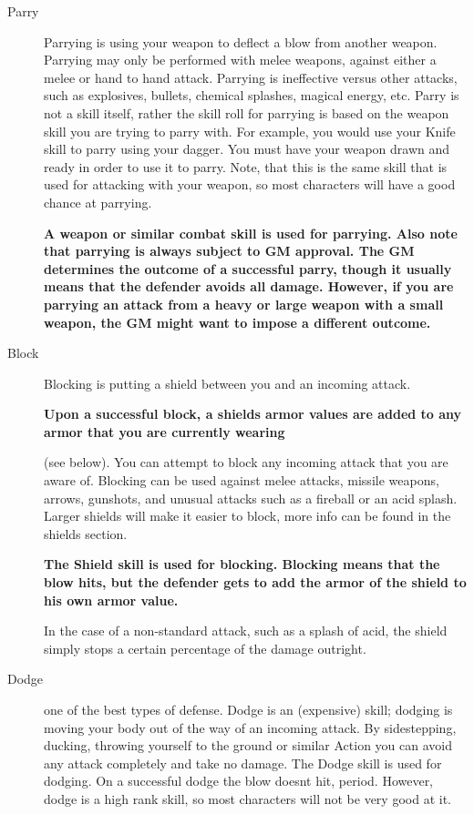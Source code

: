 \documentclass[twoside]{book}
\begin{document}
\begin{description}
    
  \item[Parry] 
    {  
    Parrying is using your weapon to deflect a blow from another weapon. Parrying may only be performed with melee weapons, against either a melee or hand to hand attack. Parrying is ineffective versus other attacks, such as explosives, bullets, chemical splashes, magical energy, etc. Parry is not a skill itself, rather the skill roll for parrying is based on the weapon skill you are trying to parry with. For example, you would use your Knife skill to parry using your dagger. You must have your weapon drawn and ready in order to use it to parry. Note, that this is the same skill that is used for attacking with your weapon, so most characters will have a good chance at parrying.

 \textbf{A weapon or similar combat skill is used for parrying. Also note that parrying is always subject to GM approval. The GM determines the outcome of a successful parry, though it usually means that the defender avoids all damage. However, if you are parrying an attack from a heavy or large weapon with a small weapon, the GM might want to impose a different outcome.}


    }
  
  \item[Block] 
    {  
    Blocking is putting a shield between you and an incoming attack.

 \textbf{Upon a successful block, a shields armor values are added to any armor that you are currently wearing}

(see below). You can attempt to block any incoming attack that you are aware of. Blocking can be used against melee attacks, missile weapons, arrows, gunshots, and unusual attacks such as a fireball or an acid splash. Larger shields will make it easier to block, more info can be found in the shields section.

 \textbf{The Shield skill is used for blocking. Blocking means that the blow hits, but the defender gets to add the armor of the shield to his own armor value.}

In the case of a non-standard attack, such as a splash of acid, the shield simply stops a certain percentage of the damage outright.
    }
  
  \item[Dodge] 
    {  
    one of the best types of defense. Dodge is an (expensive) skill; dodging is moving your body out of the way of an incoming attack. By sidestepping, ducking, throwing yourself to the ground or similar Action you can avoid any attack completely and take no damage. The Dodge skill is used for dodging. On a successful dodge the blow doesnt hit, period. However, dodge is a high rank skill, so most characters will not be very good at it.
    }
  
\end{description}
  
\end{document}
